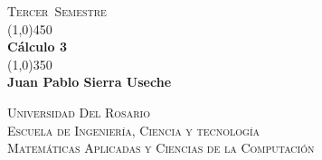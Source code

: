 \documentclass[a4paper]{book}
\newcommand{\titPag}{
    \begin{titlepage}
        \begin{flushright}
            \textsc{\large {\semestre\ Semestre}}\\
            \line(1,0){450} \\
            [0.635cm]
            \huge{\bfseries \asignatura} \\
            [0.2cm]
            \line(1,0){350} \\
            \LARGE{\bfseries \autor} \\
            [16.25cm]
        \end{flushright}
        \begin{flushright}
        \textsc{
            \universidad \\
            [0.1cm]
            \escuela \\
            [0.1cm]
            \carrera
        }
        \end{flushright}
    \end{titlepage}
}
\newcommand{\asignatura}{Cálculo 3}
\newcommand{\autor}{Juan Pablo Sierra Useche}
\newcommand{\semestre}{Tercer}
\newcommand{\universidad}{Universidad Del Rosario}
\newcommand{\escuela}{Escuela de Ingeniería, Ciencia y tecnología}
\newcommand{\carrera}{Matemáticas Aplicadas y Ciencias de la Computación}
\begin{document}
    \titPag
    \tableofcontents







    \printbibliography
\end{document}

